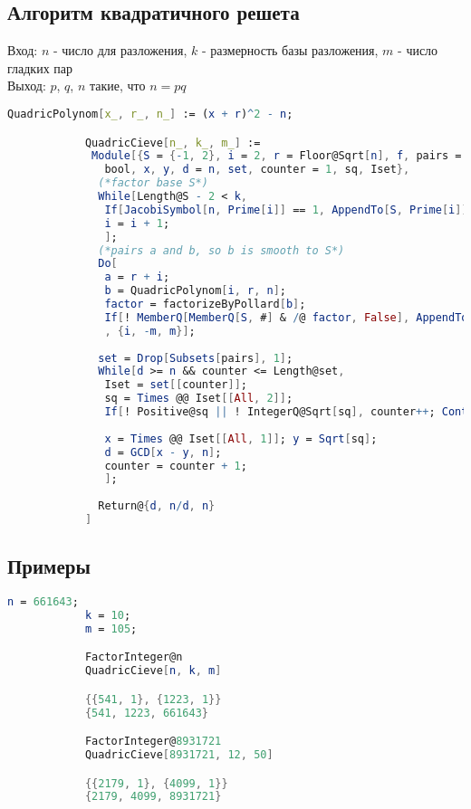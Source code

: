     	\subsection{Алгоритм квадратичного решета}
			Вход: $n$ - число для разложения, $k$ - размерность базы разложения, $m$ - число гладких пар \\
			Выход: $p$, $q$, $n$ такие, что $n = p q$

			\begin{lstlisting}[language=Mathematica,caption={
	      		Алгоритм квадратичного решета
	    	}]
			QuadricPolynom[x_, r_, n_] := (x + r)^2 - n;

			QuadricCieve[n_, k_, m_] := 
			 Module[{S = {-1, 2}, i = 2, r = Floor@Sqrt[n], f, pairs = {}, a, b, factor, 
			   bool, x, y, d = n, set, counter = 1, sq, Iset},
			  (*factor base S*)
			  While[Length@S - 2 < k,
			   If[JacobiSymbol[n, Prime[i]] == 1, AppendTo[S, Prime[i]]];
			   i = i + 1;
			   ];
			  (*pairs a and b, so b is smooth to S*)
			  Do[
			   a = r + i;
			   b = QuadricPolynom[i, r, n];
			   factor = factorizeByPollard[b];
			   If[! MemberQ[MemberQ[S, #] & /@ factor, False], AppendTo[pairs, {a, b}]];
			   , {i, -m, m}];
			  
			  set = Drop[Subsets[pairs], 1];
			  While[d >= n && counter <= Length@set,
			   Iset = set[[counter]];
			   sq = Times @@ Iset[[All, 2]];
			   If[! Positive@sq || ! IntegerQ@Sqrt[sq], counter++; Continue[]];
			   
			   x = Times @@ Iset[[All, 1]]; y = Sqrt[sq];
			   d = GCD[x - y, n];
			   counter = counter + 1;
			   ];
			  
			  Return@{d, n/d, n}
			]
	    	\end{lstlisting}

    	\subsection{Примеры}

    		\begin{lstlisting}[language=Mathematica,caption={
	      		Пример 1
	    	}]
			n = 661643;
			k = 10;
			m = 105;

			FactorInteger@n
			QuadricCieve[n, k, m]

			{{541, 1}, {1223, 1}}
			{541, 1223, 661643}

			FactorInteger@8931721
			QuadricCieve[8931721, 12, 50]

			{{2179, 1}, {4099, 1}}
			{2179, 4099, 8931721}
	    	\end{lstlisting}



